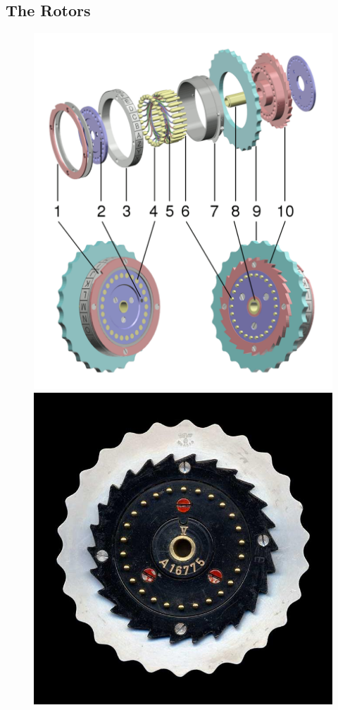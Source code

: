 \subsection{The Rotors}

\begin{figure}[H]
  \centering
  \begin{minipage}{0.48\textwidth}
    \centering
    \includegraphics[width=\linewidth]{paper/images/disassembled.png}
  \end{minipage}%
  \hfill
  \begin{minipage}{0.48\textwidth}
    \centering
    \includegraphics[width=0.8\linewidth]{paper/images/entry.jpg}

\end{minipage}
\end{figure}
